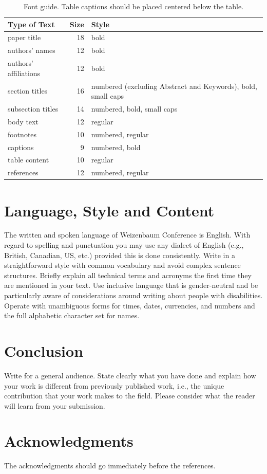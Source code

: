 \documentclass{wzbconf}
\begin{document}
\begin{table}[ht]
  \fontsize{10pt}{12.0pt}\selectfont
  \begin{tabular}{lrp{3.5cm}}
    \toprule
    \textbf{Type of Text} & \textbf{Size} & \textbf{Style} \\
    \midrule
    paper title & 18 & bold \\
    authors' names & 12 & bold \\
    authors' affiliations & 12 & bold \\
    section titles & 16 & numbered (excluding Abstract and Keywords), bold, small caps \\
    subsection titles & 14 & numbered, bold, small caps \\
    body text & 12 & regular \\
    footnotes & 10 & numbered, regular \\
    captions & 9 & numbered, bold \\
    table content & 10 & regular \\
    references & 12 & numbered, regular \\
    \bottomrule
  \end{tabular}
  \caption{Font guide.  Table captions should be placed centered below the table.}
    \label{tab:fontguide}
\end{table}


\section{Language, Style and Content}

The written and spoken language of Weizenbaum Conference is English.  With regard to spelling and punctuation you may use any dialect of English (e.g., British, Canadian, US, etc.) provided this is done consistently.  Write in a straightforward style with common vocabulary and avoid complex sentence structures.  Briefly explain all technical terms and acronyms the first time they are mentioned in your text.  Use inclusive language that is gender-neutral and be particularly aware of considerations around writing about people with disabilities.  Operate with unambiguous forms for times, dates, currencies, and numbers and the full alphabetic character set for names.

\section{Conclusion}

Write for a general audience.  State clearly what you have done and explain how your work is different from previously published work, i.e., the unique contribution that your work makes to the field.  Please consider what the reader will learn from your submission.

\section{Acknowledgments}

The acknowledgments should go immediately before the references.

\printbibliography[heading=bibnumbered]
\end{document}
